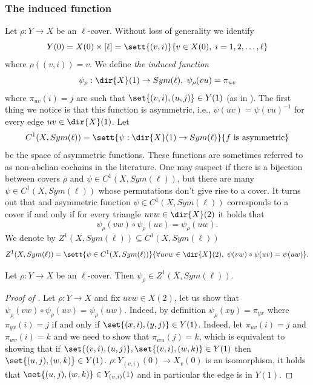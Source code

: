 \subsubsection{The induced function}
Let \(\rho:Y \to X\) be an \(\ell\)-cover. Without loss of generality we identify 
\[Y(0) = X(0) \times [\ell] = \sett{(v,i)}{v \in X(0), \; i=1,2,\dots,\ell}\]
where \(\rho((v,i)) = v\). We define \emph{the induced function} 
\begin{equation} \label{eq:induced-function}
    \psi_{\rho}:\dir{X}(1) \to Sym(\ell), \; \psi_{\rho}(vu)=\pi_{uv}
\end{equation}
where \(\pi_{uv}(i)=j\) are such that \(\set{(v,i), (u,j)} \in Y(1)\) (as in ). The first thing we notice is that this function is asymmetric, i.e., \(\psi(uv)=\psi(vu)^{-1}\) for every edge \(uv \in \dir{X}(1)\). Let 
\[C^1(X,Sym(\ell)) = \sett{\psi:\dir{X}(1)\to Sym(\ell)}{f \text{ is asymmetric}}\]
be the space of asymmetric functions. These functions are sometimes referred to as non-abelian cochains in the literature. One may suspect if there is a bijection between covers \(\rho\) and \(\psi \in C^1(X,Sym(\ell))\), but there are many \(\psi \in C^1(X,Sym(\ell))\) whose permutations don't give rise to a cover. It turns out that and asymmetric function \(\psi \in C^1(X,Sym(\ell))\) corresponds to a cover if and only if for every triangle \(uvw \in \dir{X}(2)\) it holds that \begin{equation} \label{eq:cover-condition}
    \psi_{\rho}(vw) \circ \psi_{\rho}(uv)=\psi_{\rho}(uw).
\end{equation}
We denote by \(Z^1(X,Sym(\ell)) \subseteq C^1(X,Sym(\ell))\) 
\[ Z^1(X,Sym(\ell)) = \sett{\psi \in  C^1(X,Sym(\ell))}{\forall uvw \in \dir{X}(2), \; \psi(vw) \circ \psi(uv)=\psi(uw)}.\]

\begin{claim} \label{claim:necessary-conditionfor-covers}
    Let \(\rho:Y \to X\) be an \(\ell\)-cover. Then \(\psi_{\rho} \in Z^1(X,Sym(\ell))\).
\end{claim}

\begin{proof}[Proof of ]
    Let \(\rho:Y \to X\) and fix \(uvw \in X(2)\), let us show that \(\psi_{\rho}(vw) \circ \psi_{\rho}(uv)=\psi_{\rho}(uw)\). Indeed, by definition \(\psi_{\rho}(xy) = \pi_{yx}\) where \(\pi_{yx}(i)=j\) if and only if \(\set{(x,i), (y,j)} \in Y(1)\). Indeed, let \(\pi_{uv}(i)=j\) and \(\pi_{wv}(i)=k\) and we need to show that \(\pi_{wu}(j)=k\), which is equivalent to showing that if \(\set{(v,i),(u,j)}, \set{(v,i),(w,k)} \in Y(1)\) then \(\set{(u,j),(w,k)} \in Y(1)\). \(\rho:Y_{(v,i)}(0) \to X_v(0)\) is an isomorphism, it holds that \(\set{(u,j), (w,k)} \in Y_{(v,i)}(1)\) and in particular the edge is in \(Y(1)\).
\end{proof}

